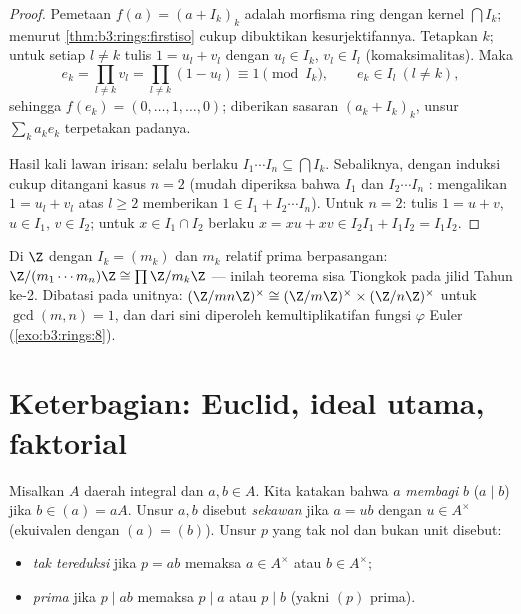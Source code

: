 \begin{proof}
Pemetaan $f(a) = (a + I_k)_k$ adalah morfisma ring dengan kernel
$\bigcap I_k$; menurut \cref{thm:b3:rings:firstiso} cukup
dibuktikan kesurjektifannya. Tetapkan $k$; untuk setiap $l \neq k$ tulis $1 = u_l +
v_l$ dengan $u_l \in I_k$, $v_l \in I_l$ (komaksimalitas). Maka
\[
e_k = \prod_{l \neq k} v_l = \prod_{l\neq k}(1 - u_l)
\equiv 1 \pmod{I_k},
\qquad e_k \in I_l \ (l \neq k),
\]
sehingga $f(e_k) = (0, \dots, 1, \dots, 0)$; diberikan sasaran $(a_k +
I_k)_k$, unsur $\sum_k a_k e_k$ terpetakan padanya.

Hasil kali lawan irisan: selalu berlaku $I_1\cdots I_n \subseteq \bigcap I_k$.
Sebaliknya, dengan induksi cukup ditangani kasus $n = 2$
(mudah diperiksa bahwa $I_1$ dan $I_2\cdots I_n$ : mengalikan
$1 = u_l + v_l$ atas $l \geq 2$ memberikan $1 \in I_1 + I_2\cdots
I_n$). Untuk $n = 2$: tulis $1 = u + v$, $u \in I_1$, $v \in I_2$;
untuk $x \in I_1 \cap I_2$ berlaku $x = xu + xv \in I_2I_1 + I_1I_2 =
I_1I_2$.
\end{proof}

\begin{example}\label{ex:b3:rings:crtz}
Di $\Z$ dengan $I_k = (m_k)$ dan $m_k$ relatif prima berpasangan: $\Z/(m_1\cdots
m_n)\Z \cong \prod \Z/m_k\Z$ --- inilah teorema sisa Tiongkok pada
jilid Tahun ke-2. Dibatasi pada unitnya: $(\Z/mn\Z)^\times \cong
(\Z/m\Z)^\times \times (\Z/n\Z)^\times$ untuk $\gcd(m,n)=1$, dan dari sini
diperoleh kemultiplikatifan fungsi $\varphi$ Euler
(\cref{exo:b3:rings:8}).
\end{example}

\section{Keterbagian: Euclid, ideal utama, faktorial}

\begin{definition}\label{def:b3:rings:divisibility}
Misalkan $A$ daerah integral dan $a, b \in A$. Kita katakan bahwa $a$
\emph{membagi} $b$ ($a \mid b$) jika $b \in (a) = aA$. Unsur $a, b$
disebut \emph{sekawan} jika $a = ub$
dengan $u \in A^\times$ (ekuivalen dengan $(a) = (b)$). Unsur $p$ yang
tak nol dan bukan unit disebut:
\begin{itemize}
  \item \emph{tak tereduksi} jika $p = ab$
        memaksa $a \in A^\times$ atau $b \in A^\times$;
  \item \emph{prima} jika $p \mid ab$ memaksa $p
        \mid a$ atau $p \mid b$ (yakni  $(p)$ prima).
\end{itemize}
\end{definition}

